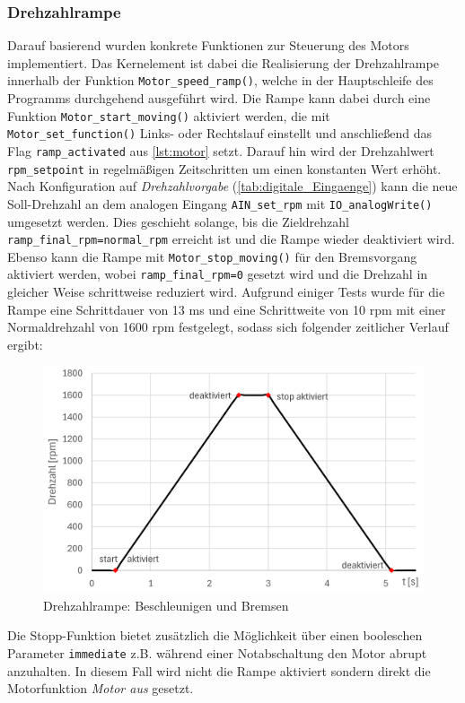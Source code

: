\subsubsection{Drehzahlrampe}
Darauf basierend wurden konkrete Funktionen zur Steuerung des Motors implementiert. Das Kernelement ist dabei die Realisierung der Drehzahlrampe innerhalb der Funktion \verb|Motor_speed_ramp()|, welche in der Hauptschleife des Programms durchgehend ausgeführt wird. Die Rampe kann dabei durch eine Funktion \verb|Motor_start_moving()| aktiviert werden, die mit \verb|Motor_set_function()| Links- oder Rechtslauf einstellt und anschließend das Flag \verb|ramp_activated| aus \autoref{lst:motor} setzt. Darauf hin wird der Drehzahlwert \verb|rpm_setpoint| in regelmäßigen Zeitschritten um einen konstanten Wert erhöht. Nach Konfiguration auf \textit{Drehzahlvorgabe} (\autoref{tab:digitale_Eingaenge}) kann die neue Soll-Drehzahl an dem analogen Eingang \verb|AIN_set_rpm| mit \verb|IO_analogWrite()| umgesetzt werden. Dies geschieht solange, bis die Zieldrehzahl \verb|ramp_final_rpm=normal_rpm| erreicht ist und die Rampe wieder deaktiviert wird. Ebenso kann die Rampe mit \verb|Motor_stop_moving()| für den Bremsvorgang aktiviert werden, wobei \verb|ramp_final_rpm=0| gesetzt wird und die Drehzahl in gleicher Weise schrittweise reduziert wird. Aufgrund einiger Tests wurde für die Rampe eine Schrittdauer von 13 ms und eine Schrittweite von 10 rpm mit einer Normaldrehzahl von 1600 rpm festgelegt, sodass sich folgender zeitlicher Verlauf ergibt:
\begin{figure}[H]
	\centering
	\includegraphics[width=0.75\linewidth]{images/Software/SpeedRamp.png}
	\caption{Drehzahlrampe: Beschleunigen und Bremsen}
	\label{fig:speedRamp}
\end{figure}
\noindent
Die Stopp-Funktion bietet zusätzlich die Möglichkeit über einen booleschen Parameter \verb|immediate| z.B. während einer Notabschaltung den Motor abrupt anzuhalten. In diesem Fall wird nicht die Rampe aktiviert sondern direkt die Motorfunktion \textit{Motor aus} gesetzt. 

